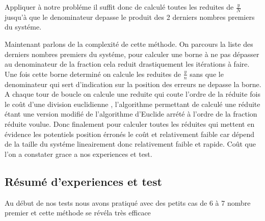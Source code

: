 \documentclass[a4paper, 11pt]{article}
\begin{document}
Appliquer à notre probléme il suffit donc de calculé toutes les reduites de $\frac{y}{N}$ jusqu'à que le denominateur depasse le produit des 2 derniers nombres premiers du systéme.\newline

Maintenant parlons de la complexité de cette méthode. 
On parcours la liste des derniers nombres premiers du systéme, pour calculer une borne à ne pas dépasser au denominateur de la fraction cela reduit drastiquement les itérations à faire.
Une fois cette borne determiné on calcule les reduites de  $\frac{y}{n}$ sans que le denominateur qui sert d'indication sur la position des erreurs ne depasse la borne.
A chaque tour de boucle on calcule une reduite qui coute l'ordre de la réduite fois le coût d'une division euclidienne  ,
l'algorithme permettant de calculé une réduite étant une version modifié de l'algorithme d'Euclide arrété à l'ordre de la fraction réduite voulue.
Donc finalement pour calculer toutes les réduites qui mettent en évidence les potentiels position érronés le coût et relativement faible car dépend de la taille du systéme lineairement donc relativement faible et rapide.
Coût que l'on a constater grace a nos experiences et test.






\newpage
\subsection{Résumé d'experiences et test}
Au début de nos tests nous avons pratiqué avec des petits cas de 6 à 7 nombre premier et cette méthode se révéla très efficace 
\end{document}
